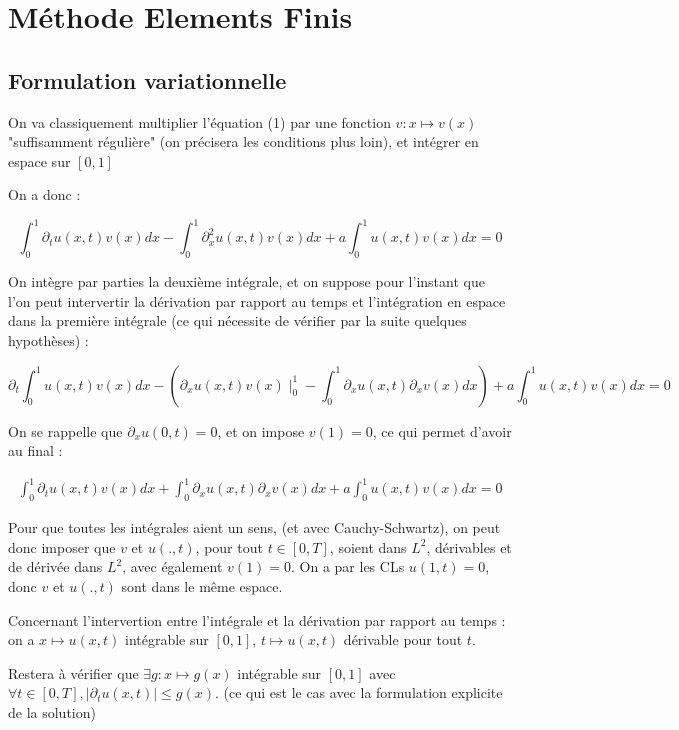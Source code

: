 \documentclass[french]{article}
\begin{document}
\section{Méthode Elements Finis}

\subsection{Formulation variationnelle}

On va classiquement multiplier l'équation (1) par une fonction $ v : x \mapsto v(x) $ "suffisamment régulière" (on précisera les conditions plus loin), et intégrer en espace sur $ [0,1] $

On a donc :

\[
\int_{0}^{1}\partial_{t}u(x,t)v(x)dx - 
\int_{0}^{1}\partial_{x}^{2}u(x,t)v(x)dx + 
a\int_{0}^{1}u(x,t)v(x)dx = 0
\]

On intègre par parties la deuxième intégrale, et on suppose pour l'instant que l'on peut intervertir la dérivation par rapport au temps et l'intégration en espace dans la première intégrale (ce qui nécessite de vérifier par la suite quelques hypothèses) :

\[
\partial_{t}\int_{0}^{1}u(x,t)v(x)dx - 
\left(
\partial_{x}u(x,t)v(x)\mid_{0}^{1}-
\int_{0}^{1}\partial_{x}u(x,t)\partial_{x}v(x)dx 
\right) + 
a\int_{0}^{1}u(x,t)v(x)dx = 0
\]

On se rappelle que $\partial_{x}u(0,t) = 0$, et on impose $ v(1)=0 $, ce qui permet d'avoir au final :

\begin{align}
\int_{0}^{1}\partial_{t}u(x,t)v(x)dx +
\int_{0}^{1}\partial_{x}u(x,t)\partial_{x}v(x)dx +
a\int_{0}^{1}u(x,t)v(x)dx = 0
\end{align}

Pour que toutes les intégrales aient un sens, (et avec Cauchy-Schwartz), on peut donc imposer que $ v $ et $ u(.,t) $, pour tout $ t \in [0,T] $, soient dans $ L^{2} $, dérivables et de dérivée dans $ L^{2} $, avec également $ v(1) = 0 $. On a par les CLs $ u(1,t)=0 $, donc $ v $ et $ u(.,t) $ sont dans le même espace.

Concernant l'intervertion entre l'intégrale et la dérivation par rapport au temps : on a $ x \mapsto u(x,t) $ intégrable sur $ [0,1] $, $ t \mapsto u(x,t) $ dérivable pour tout $ t $. 

Restera à vérifier que $ \exists g:x\mapsto g(x) $ intégrable sur $ [0,1] $ avec $ \forall t \in [0,T], |\partial_{t}u(x,t)| \leq g(x) $. (ce qui est le cas avec la formulation explicite de la solution)
\end{document}

